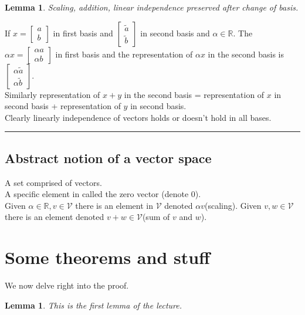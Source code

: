 \documentclass[twoside]{article}
\newtheorem{lemma}[theorem]{Lemma}
\newenvironment{proof}{{\bf Proof:}}{\hfill\rule{2mm}{2mm}}
\begin{document}
\begin{lemma}Scaling, addition, linear independence preserved after change of basis.\end{lemma}
\begin{proof}
If $x=
\begin{bmatrix}
a\\
b
\end{bmatrix}$
 in first basis and
$\begin{bmatrix}
           \widetilde{a}\\
           \widetilde{b}
\end{bmatrix}$ in second basis and $\alpha \in \mathbb{R}$.
The $\alpha x = \begin{bmatrix}
\alpha a\\
\alpha b
\end{bmatrix}$ in first basis and the representation of $\alpha x$ in the second basis is $\begin{bmatrix}
\alpha \widetilde{a}\\
\alpha \widetilde{b}
\end{bmatrix}$.\\
Similarly representation of $x +y$ in the second basis = representation of $x$ in second basis + representation of $y$ in second basis.\\
Clearly linearly independence of vectors holds or doesn't hold in all bases.
\end{proof}
\subsection{Abstract notion of a vector space}
A set  comprised of vectors.\\
A specific element in  called the zero vector (denote 0).\\
Given $\alpha \in \mathbb{R}, v \in  \mathcal{V}$ there is an element in  $\mathcal{V}$ denoted $\alpha v$(scaling).
Given $v,w \in  \mathcal{V}$ there is an element denoted $v+w\in  \mathcal{V}$(sum of $v$ and $w$).


\section{Some theorems and stuff}

We now delve right into the proof.

\begin{lemma}
This is the first lemma of the lecture.
\end{lemma}
\end{document}
